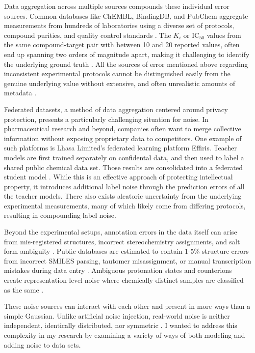 Data aggregation across multiple sources compounds these individual error sources. Common databases like ChEMBL, BindingDB, and PubChem aggregate measurements from hundreds of laboratories using a diverse set of protocols, compound purities, and quality control standards \citep{Gaulton2017, Gilson2016}. The $K_i$ or IC$_{50}$ values from the same compound-target pair with between 10 and 20 reported values, often end up spanning two orders of magnitude apart, making it challenging to identify the underlying ground truth \citep{Kramer2012}. All the sources of error mentioned above regarding inconsistent experimental protocols cannot be distinguished easily from the genuine underlying value without extensive, and often unrealistic amounts of metadata \citep{Fourches2016}.


Federated datasets, a method of data aggregation centered around privacy protection, presents a particularly challenging situation for noise. In pharmaceutical research and beyond, companies often want to merge collective information without exposing proprietary data to competitors. One example of such platforms is Lhasa Limited's federated learning platform Effiris. Teacher models are first trained separately on confidental data, and then used to label a shared public chemical data set. Those results are consolidated into a federated student model \citep{Bassani2023}. While this is an effective approach of protecting intellectual property, it introduces additional label noise through the prediction errors of all the teacher models. There also exists aleatoric uncertainty from the underlying experimental measurements, many of which likely come from differing protocols, resulting in compounding label noise. 

Beyond the experimental setups, annotation errors in the data itself can arise from mis-registered structures, incorrect stereochemistry assignments, and salt form ambiguity \citep{Williams2017}. Public databases are estimated to contain 1-5\% structure errors from incorrect SMILES parsing, tautomer misassignment, or manual transcription mistakes during data entry \citep{Young2008}. Ambiguous protonation states and counterions create representation-level noise where chemically distinct samples are classified as the same \citep{Bento2020}.

These noise sources can interact with each other and present in more ways than a simple Gaussian. Unlike artificial noise injection, real-world noise is neither independent, identically distributed, nor symmetric  \citep{Heid2023}. I wanted to address this complexity in my research by examining a variety of ways of both modeling and adding noise to data sets. 

